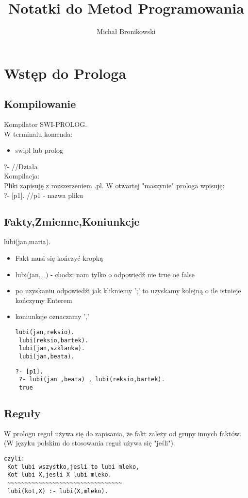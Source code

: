 \documentclass{article}
\title{Notatki do Metod Programowania}
\author{Michał Bronikowski}
\begin{document}
\maketitle
\newpage
\tableofcontents
\newpage
\section{Wstęp do Prologa}
\subsection{Kompilowanie}
Kompilator SWI-PROLOG.\\
W terminalu komenda:

\begin{itemize}
\item swipl lub prolog
\end{itemize}
?- //Działa\\
Kompilacja:\\
Pliki zapisuję z rozszerzeniem .pl. W otwartej "maszynie" prologa wpisuję:\\
?- [p1].  //p1 - nazwa pliku
\subsection{Fakty,Zmienne,Koniunkcje}
lubi(jan,maria).\\
\begin{itemize}
\item Fakt musi się kończyć kropką
\item lubi(jan,\_) - chodzi nam tylko o odpowiedź nie true oe false
\item  po uzyskaniu odpowiedźi jak klikniemy ';' to uzyskamy kolejną o ile istnieje kończymy Enterem
\item koniunkcje oznaczamy ',' 
\begin{lstlisting}[caption=Plik p1.pl]
 lubi(jan,reksio).
 lubi(reksio,bartek).
 lubi(jan,szklanka).
 lubi(jan,beata).
\end{lstlisting}
\begin{lstlisting}[caption=Działanie]
 ?- [p1]. 
 ?- lubi(jan ,beata) , lubi(reksio,bartek).
 true
\end{lstlisting}
\end{itemize}
\subsection{Reguły}
W prologu reguł używa się do zapisania, że fakt zależy od grupy innych faktów.(W języku polskim do stosowania reguł używa się "jeśli").
\begin{lstlisting}[caption = Kot lubi każdego kto lubi mleko]
 czyli:
 Kot lubi wszystko,jesli to lubi mleko,
 Kot lubi X,jesli X lubi mleko.
 ~~~~~~~~~~~~~~~~~~~~~~~~~~~~~~~~~
 lubi(kot,X) :- lubi(X,mleko).

\end{lstlisting}
\end{document}
